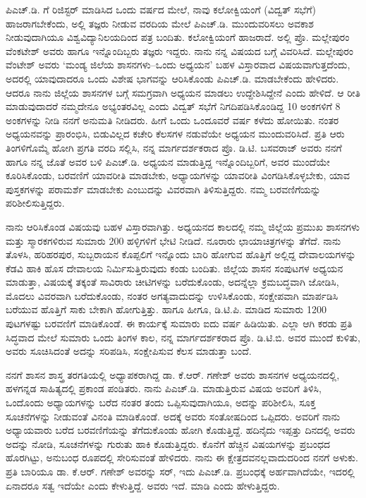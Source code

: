 ಪಿಎಚ್​.ಡಿ. ಗೆ ರಿಜಿಸ್ಟರ್​ ಮಾಡಿಸಿದ ಒಂದು ವರ್ಷದ ಮೇಲೆ, ನಾವು ಕಲೋಕ್ವಿಯಂಗೆ (ವಿದ್ವತ್​ ಸಭೆಗೆ) ಹಾಜರಾಗಬೇಕೆಂದು, ಅಲ್ಲಿ ತಜ್ಞರು ನೀಡುವ ವರದಿಯ ಮೇಲೆ ಪಿಎಚ್​.ಡಿ. ಮುಂದುವರಿಸಲು ಅವಕಾಶ ನೀಡುವುದಾಗಿಯೂ ವಿಶ್ವವಿದ್ಯಾನಿಲಯದಿಂದ ಪತ್ರ ಬಂದಿತು. ಕಲೋಕ್ವಿಯಂಗೆ ಹಾಜರಾದೆ. ಅಲ್ಲಿ ಪ್ರೊ. ಮಲ್ಲೇಪುರಂ ವೆಂಕಟೇಶ್​ ಅವರು ಹಾಗೂ ಇನ್ನೊಂದಿಬ್ಬರು ತಜ್ಞರು ಇದ್ದರು. ನಾನು ನನ್ನ ವಿಷಯದ ಬಗ್ಗೆ ವಿವರಿಸಿದೆ. ಮಲ್ಲೇಪುರಂ ವೆಂಟೇಶ್​ ಅವರು ‘ಮಂಡ್ಯ ಜಿಲೆಯ ಶಾಸನಗಳು–ಒಂದು ಅಧ್ಯಯನ’ ಬಹಳ ವಿಸ್ತಾರವಾದ ವಿಷಯವಾಗುತ್ತದೆಂದು, ಅದರಲ್ಲಿ ಯಾವುದಾದರೂ ಒಂದು ವಿಶೇಷ ಭಾಗವನ್ನು ಆರಿಸಿಕೊಂಡು ಪಿಎಚ್​.ಡಿ. ಮಾಡಬೇಕೆಂದು ಹೇಳಿದರು. ಆದರೂ ನಾನು ಜಿಲ್ಲೆಯ ಶಾಸನಗಳ ಬಗ್ಗೆ ಸಮಗ್ರವಾಗಿ ಅಧ್ಯಯನ ಮಾಡಲು ಉದ್ದೇಶಿಸಿದ್ದೇನೆ ಎಂದು ಹೇಳಿದೆ. ಆ ರೀತಿ ಮಾಡುವುದಾದರೆ ನಮ್ಮದೇನೂ ಅಭ್ಯಂತರವಿಲ್ಲ ಎಂದು ವಿದ್ವತ್​ ಸಭೆಗೆ ನಿಗದಿಪಡಿಸಿಕೊಂಡಿದ್ದ 10 ಅಂಕಗಳಿಗೆ 8 ಅಂಕಗಳನ್ನು ನೀಡಿ ನನಗೆ ಅನುಮತಿ ನೀಡಿದರು. ಹೀಗೆ ಒಂದು ಒಂದೂವರೆ ವರ್ಷ ಕಳೆದು ಹೋಯಿತು. ನಂತರ ಅಧ್ಯಯನವನ್ನು ಪ್ರಾರಂಭಿಸಿ, ಬಿಡುವಿಲ್ಲದ ಕಚೇರಿ ಕೆಲಸಗಳ ನಡುವೆಯೇ ಅಧ್ಯಯನ ಮುಂದುವರಿಸಿದೆ. ಪ್ರತಿ ಆರು ತಿಂಗಳಿಗೊಮ್ಮೆ ಹೋಗಿ ಪ್ರಗತಿ ವರದಿ ಸಲ್ಲಿಸಿ, ನನ್ನ ಮಾರ್ಗದರ್ಶಕರಾದ ಪ್ರೊ. ಡಿ.ಟಿ. ಬಸವರಾಜ್​ ಅವರು ನನಗೆ ಹಾಗೂ ನನ್ನ ಜೊತೆ ಅವರ ಬಳಿ ಪಿಎಚ್​.ಡಿ. ಅಧ್ಯಯನ ಮಾಡುತ್ತಿದ್ದ ಇನ್ನೊಂದಿಬ್ಬರಿಗೆ, ಅವರ ಮುಂದೆಯೇ ಕೂರಿಸಿಕೊಂಡು, ಬರವಣಿಗೆ ಯಾವರೀತಿ ಮಾಡಬೇಕು, ಅಧ್ಯಾಯಗಳನ್ನು ಯಾವರೀತಿ ವಿಂಗಡಿಸಿಕೊಳ್ಳಬೇಕು, ಯಾವ ಪುಸ್ತಕಗಳನ್ನು ಪರಾಮರ್ಶೆ ಮಾಡಬೇಕು ಎಂಬುದನ್ನು ವಿವರವಾಗಿ ತಿಳಿಸುತ್ತಿದ್ದರು. ನಮ್ಮ ಬರವಣಿಗೆಯನ್ನು ಪರಿಶೀಲಿಸುತ್ತಿದ್ದರು. 

\newpage

ನಾನು ಆರಿಸಿಕೊಂಡ ವಿಷಯವು ಬಹಳ ವಿಸ್ತಾರವಾಗಿತ್ತು. ಅಧ್ಯಯನದ ಕಾಲದಲ್ಲಿ ನಮ್ಮ ಜಿಲ್ಲೆಯ ಪ್ರಮುಖ ಶಾಸನಗಳು ಮತ್ತು ಸ್ಮಾರಕಗಳಿರುವ ಸುಮಾರು 200 ಹಳ್ಳಿಗಳಿಗೆ ಭೇಟಿ ನೀಡಿದೆ. ನೂರಾರು ಛಾಯಾಚಿತ್ರಗಳನ್ನು ತೆಗೆದೆ. ನಾನು ತೊಳಸಿ, ಹರಿಹರಪುರ, ಸುಬ್ಬರಾಯನ ಕೊಪ್ಪಲಿಗೆ ಇನ್ನೊಂದು ಬಾರಿ ಹೋಗುವ ಹೊತ್ತಿಗೆ ಅಲ್ಲಿದ್ದ ದೇವಾಲಯಗಳನ್ನು ಕೆಡವಿ ಹಾಕಿ ಹೊಸ ದೇವಾಲಯ ನಿರ್ಮಿಸುತ್ತಿರುವುದು ಕಂಡು ಬಂದಿತು. ಜಿಲ್ಲೆಯ ಶಾಸನ ಸಂಪುಟಗಳ ಅಧ್ಯಯನ ಮಾಡುತ್ತಾ, ವಿಷಯಕ್ಕೆ ತಕ್ಕಂತೆ ಸಾವಿರಾರು ಚೀಟಿಗಳನ್ನು ಬರೆದುಕೊಂಡು, ಅದನ್ನೆಲ್ಲಾ ಕ್ರಮಬದ್ಧವಾಗಿ ಜೋಡಿಸಿ, ಮೊದಲು ವಿವರವಾಗಿ ಬರೆದುಕೊಂಡು, ನಂತರ ಅಗತ್ಯವಾದುದನ್ನು ಉಳಿಸಿಕೊಂಡು, ಸಂಕ್ಷೇಪವಾಗಿ ಮಾರ್ಪಡಿಸಿ ಬರೆಯುವ ಹೊತ್ತಿಗೆ ಸಾಕು ಬೇಕಾಗಿ ಹೋಗುತ್ತಿತ್ತು. ಹಾಗೂ ಹೀಗೂ, ಡಿ.ಟಿ.ಪಿ. ಮಾಡಿದ ಸುಮಾರು 1200 ಪುಟಗಳಷ್ಟು ಬರವಣಿಗೆ ಮಾಡಿಕೊಂಡೆ. ಈ ಕಾರ್ಯಕ್ಕೆ ಸುಮಾರು ಐದು ವರ್ಷ ಹಿಡಿಯಿತು. ಎಲ್ಲಾ ಆಗಿ ಕರಡು ಪ್ರತಿ ಸಿದ್ಧವಾದ ಮೇಲೆ ಸುಮಾರು ಒಂದು ತಿಂಗಳ ಕಾಲ, ನನ್ನ ಮಾರ್ಗದರ್ಶಕರಾದ ಪ್ರೊ. ಡಿ.ಟಿ.ಬಿ. ಅವರ ಮುಂದೆ ಕುಳಿತು, ಅವರು ಸೂಚಿಸಿದಂತೆ ಅದನ್ನು ಸರಿಪಡಿಸಿ, ಸಂಕ್ಷೇಪಿಸುವ ಕೆಲಸ ಮಾಡುತ್ತಾ ಬಂದೆ. 

ನನಗೆ ಶಾಸನ ಶಾಸ್ತ್ರ ತರಗತಿಯಲ್ಲಿ ಅಧ್ಯಾಪಕರಾಗಿದ್ದ ಡಾ. ಕೆ.ಆರ್​. ಗಣೇಶ್​ ಅವರು ಶಾಸನಗಳ ಅಧ್ಯಯನದಲ್ಲಿ, ಹಳಗನ್ನಡ ಸಾಹಿತ್ಯದಲ್ಲಿ ಪ್ರಕಾಂಡ ಪಂಡಿತರು. ನಾನು ಪಿಎಚ್​.ಡಿ. ಮಾಡುತ್ತಿರುವ ವಿಷಯ ಅವರಿಗೆ ತಿಳಿಸಿ, ಒಂದೊಂದು ಅಧ್ಯಾಯಗಳನ್ನು ಬರೆದ ನಂತರ ತಂದು ಒಪ್ಪಿಸುವುದಾಗಿಯೂ, ಅದನ್ನು ಪರಿಶೀಲಿಸಿ, ಸೂಕ್ತ ಸೂಚನೆಗಳನ್ನು ನೀಡುವಂತೆ ವಿನಂತಿ ಮಾಡಿಕೊಂಡೆ. ಅದಕ್ಕೆ ಅವರು ಸಂತೋಷದಿಂದ ಒಪ್ಪಿದರು. ಅವರಿಗೆ ನಾನು ಅಧ್ಯಾಯವಾರು ಬರೆದ ಬರವಣಿಗೆಯನ್ನು ತೆಗೆದುಕೊಂಡು ಹೋಗಿ ಕೊಡುತ್ತಿದ್ದೆ. ಹದಿನೈದು ಇಪ್ಪತ್ತು ದಿನದಲ್ಲಿ ಅವರು ಅದನ್ನು ನೋಡಿ, ಸೂಚನೆಗಳನ್ನು ಗುರುತು ಹಾಕಿ ಕೊಡುತ್ತಿದ್ದರು. ಕೊನೆಗೆ ಹೆಚ್ಚಿನ ವಿಷಯಗಳನ್ನು ಪ್ರಬಂಧದ ಹೊರಗಿಟ್ಟು, ಅನುಬಂಧ ರೂಪದಲ್ಲಿ ಸೇರಿಸುವಂತೆ ಹೇಳಿದರು. ನಾನು ಈ ಕ್ಷೇತ್ರದವನಲ್ಲವಾದುದರಿಂದ ನನಗೆ ಅಳುಕು. ಪ್ರತಿ ಬಾರಿಯೂ ಡಾ. ಕೆ.ಆರ್​. ಗಣೇಶ್​ ಅವರನ್ನು ಸರ್​, ಇದು ಪಿಎಚ್​.ಡಿ. ಪ್ರಬಂಧಕ್ಕೆ ಅರ್ಹವಾಗಿದೆಯೇ, ಇದರಲ್ಲಿ ಏನಾದರೂ ಸತ್ವ ಇದೆಯೇ ಎಂದು ಕೇಳುತ್ತಿದ್ದೆ. ಅವರು ಇದೆ. ಮಾಡಿ ಎಂದು ಹೇಳುತ್ತಿದ್ದರು.

